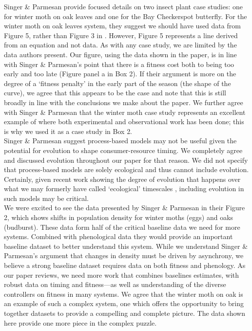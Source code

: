 \documentclass[11pt,letter]{article}
\begin{document}
Singer \& Parmesan provide focused details on two insect plant case studies: one for winter moth on oak leaves and one for the Bay Checkerspot butterfly. For the winter moth on oak leaves system, they suggest we should have used data from Figure 5, rather than Figure 3 in \citet{tikka2003}. However, Figure 5 represents a line derived from an equation and not data. As with any case study, we are limited by the data authors present. Our figure, using the data shown in the paper, is in line with Singer \& Parmesan's point that there is a fitness cost both to being too early and too late (Figure panel a in Box 2). If their argument is more on the degree of a `fitness penalty' in the early part of the season (the shape of the curve), we agree that this appears to be the case and note that this is still broadly in line with the conclusions we make about the paper. We further agree with Singer \& Parmesan that the winter moth case study represents an excellent example of where both experimental and observational work has been done; this is why we used it as a case study in Box 2. \\

Singer \& Parmesan suggest process-based models may not be useful given the potential for evolution to shape consumer-resource timing. We completely agree and discussed evolution throughout our paper for that reason. We did not specify that process-based models are solely ecological and thus cannot include evolution. Certainly, given recent work showing the degree of evolution that happens over what we may formerly have called `ecological' timescales \citep[e.g.,][]{lusten2018,charm2014fe,carroll2007}, including evolution in such models may be critical. \\

We were excited to see the data presented by Singer \& Parmesan in their Figure 2, which shows shifts in population density for winter moths (eggs) and oaks (budburst). These data form half of the critical baseline data we need for more systems. Combined with phenological data they would provide an important baseline dataset to better understand this system. While we understand Singer \& Parmesan's argument that changes in density must be driven by asynchrony, we believe a strong baseline dataset requires data on both fitness and phenology. As our paper reviews, we need more work that combines baselines estimates, with robust data on timing and fitness---as well as understanding of the diverse controllers on fitness in many systems. We agree that the winter moth on oak is an example of such a complex system, one which offers the opportunity to bring together datasets to provide a compelling and complete picture. The data shown here provide one more piece in the complex puzzle. \\
\end{document}
